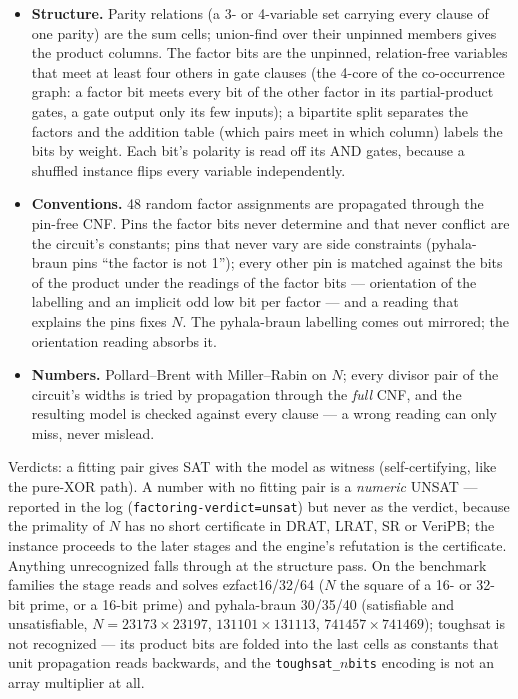 \documentclass[10pt]{article}
\begin{document}
\begin{itemize}
\item \textbf{Structure.} Parity relations (a 3- or 4-variable set
  carrying every clause of one parity) are the sum cells; union-find
  over their unpinned members gives the product columns. The factor
  bits are the unpinned, relation-free variables that meet at least
  four others in gate clauses (the 4-core of the co-occurrence graph:
  a factor bit meets every bit of the other factor in its
  partial-product gates, a gate output only its few inputs); a
  bipartite split separates the factors and the addition table (which
  pairs meet in which column) labels the bits by weight. Each bit's
  polarity is read off its AND gates, because a shuffled instance flips
  every variable independently.
\item \textbf{Conventions.} 48 random factor assignments are propagated
  through the pin-free CNF. Pins the factor bits never determine and
  that never conflict are the circuit's constants; pins that never
  vary are side constraints (pyhala-braun pins ``the factor is not
  1''); every other pin is matched against the bits of the product
  under the readings of the factor bits --- orientation of the
  labelling and an implicit odd low bit per factor --- and a reading
  that explains the pins fixes $N$. The pyhala-braun labelling comes
  out mirrored; the orientation reading absorbs it.
\item \textbf{Numbers.} Pollard--Brent with Miller--Rabin on $N$;
  every divisor pair of the circuit's widths is tried by propagation
  through the \emph{full} CNF, and the resulting model is checked
  against every clause --- a wrong reading can only miss, never
  mislead.
\end{itemize}

Verdicts: a fitting pair gives SAT with the model as witness
(self-certifying, like the pure-XOR path). A number with no fitting
pair is a \emph{numeric} UNSAT --- reported in the log
(\texttt{factoring-verdict=unsat}) but never as the verdict, because
the primality of $N$ has no short certificate in DRAT, LRAT, SR or
VeriPB; the instance proceeds to the later stages and the engine's
refutation is the certificate. Anything unrecognized falls through at
the structure pass. On the benchmark families the stage reads and
solves ezfact16/32/64 ($N$ the square of a 16- or 32-bit prime, or a
16-bit prime) and pyhala-braun 30/35/40 (satisfiable and
unsatisfiable, $N = 23173\times 23197$, $131101\times 131113$,
$741457\times 741469$); toughsat is not recognized --- its product
bits are folded into the last cells as constants that unit propagation
reads backwards, and the \texttt{toughsat\_}$n$\texttt{bits} encoding is
not an array multiplier at all.
\end{document}
